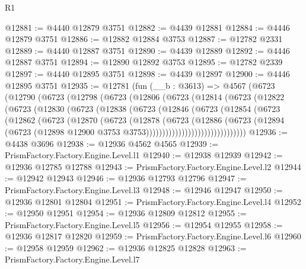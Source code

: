 \begin{lexlean}{R1}
\begin{coremodule}
@12881 := @4440 @12879 @3751
@12882 := @4439 @12881
@12884 := @4446 @12879 @3751
@12886 := @12882 @12884 @3753
@12887 := @12782 @2331
@12889 := @4440 @12887 @3751
@12890 := @4439 @12889
@12892 := @4446 @12887 @3751
@12894 := @12890 @12892 @3753
@12895 := @12782 @2339
@12897 := @4440 @12895 @3751
@12898 := @4439 @12897
@12900 := @4446 @12895 @3751
@12935 := @12781
    (fun (__b : @3613) =>
    @4567
      (@6723
        (@12790
          (@6723
            (@12798
              (@6723
                (@12806
                  (@6723
                    (@12814
                      (@6723
                        (@12822
                          (@6723
                            (@12830
                              (@6723
                                (@12838
                                  (@6723
                                    (@12846
                                      (@6723
                                        (@12854
                                          (@6723
                                            (@12862
                                              (@6723
                                                (@12870
                                                  (@6723
                                                    (@12878
                                                      (@6723
                                                        (@12886
                                                          (@6723
                                                            (@12894
                                                              (@6723
                                                                (@12898
                                                                  @12900
                                                                  @3753
                                                                  @3753)))))))))))))))))))))))))))))))
@12936 := @4438 @3696
@12938 := @12936 @4562 @4565
@12939 := PrismFactory.Factory.Engine.Level.l1
@12940 := @12938 @12939
@12942 := @12936 @12785 @12788
@12943 := PrismFactory.Factory.Engine.Level.l2
@12944 := @12942 @12943
@12946 := @12936 @12793 @12796
@12947 := PrismFactory.Factory.Engine.Level.l3
@12948 := @12946 @12947
@12950 := @12936 @12801 @12804
@12951 := PrismFactory.Factory.Engine.Level.l4
@12952 := @12950 @12951
@12954 := @12936 @12809 @12812
@12955 := PrismFactory.Factory.Engine.Level.l5
@12956 := @12954 @12955
@12958 := @12936 @12817 @12820
@12959 := PrismFactory.Factory.Engine.Level.l6
@12960 := @12958 @12959
@12962 := @12936 @12825 @12828
@12963 := PrismFactory.Factory.Engine.Level.l7

\end{coremodule}
\end{lexlean}
